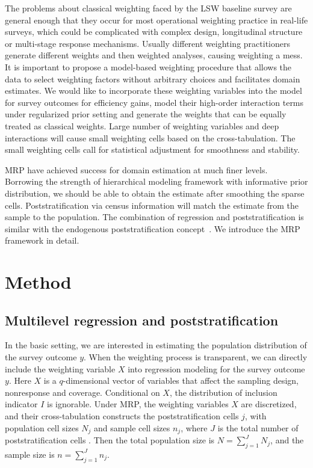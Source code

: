\documentclass[11pt]{article}
\numberwithin{figure}{section}
\numberwithin{table}{section}
\numberwithin{equation}{section}
\begin{document}
The problems about classical weighting faced by the LSW baseline survey are
general enough that they occur for most operational weighting practice in
real-life surveys, which could be complicated with complex design, longitudinal
structure or multi-stage response mechanisms. Usually different weighting
practitioners generate different weights and then weighted analyses, causing
weighting a mess. It is important to propose a model-based weighting procedure
that allows the data to select weighting factors without arbitrary choices and
facilitates domain estimates. We would like to incorporate these weighting
variables into the model for survey outcomes for efficiency gains, model their
high-order interaction terms under regularized prior setting and generate the
weights that can be equally treated as classical weights. Large number of
weighting variables and deep interactions will cause small weighting cells
based on the cross-tabulation. The small weighting cells call for statistical
adjustment for smoothness and stability. 
		
MRP have achieved success for domain estimation at much finer levels. Borrowing
the strength of hierarchical modeling framework with informative prior
distribution, we should be able to obtain the estimate after smoothing the
sparse cells. Poststratification via census information will match the estimate
from the sample to the population. The combination of regression and
poststratification is similar with the endogenous poststratification
concept~\citep{Breidt08,Dahlke13}. We introduce the MRP framework in detail.
	

\section{Method} \label{method}

\subsection{Multilevel regression and poststratification} In the basic setting,
we are interested in estimating the population distribution of the survey
outcome $y$. When the weighting process is transparent, we can directly include
the weighting variable $X$ into regression modeling for the survey outcome $y$.
Here $X$ is a $q$-dimensional vector of variables that affect the sampling
design, nonresponse and coverage. Conditional on $X$, the distribution of
inclusion indicator $I$ is ignorable. Under MRP, the weighting variables $X$
are discretized, and their cross-tabulation constructs the poststratification
cells $j$, with population cell sizes $N_j$ and sample cell sizes $n_j$, where
$J$ is the total number of poststratification cells \citep{little91, little93,
gelman:little:97,gelmancarlin01}. Then the total population size is
$N=\sum_{j=1}^J N_j$, and the sample size is $n=\sum_{j=1}^Jn_j$. 
\end{document}
